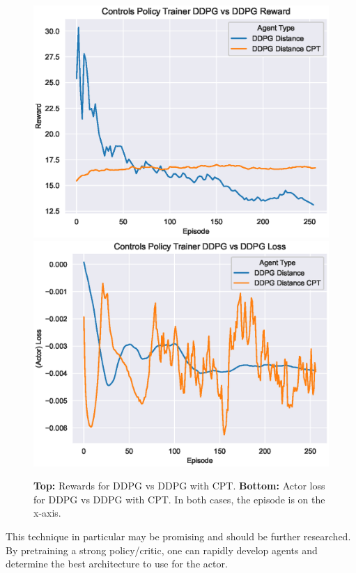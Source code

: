 \begin{figure}[!ht]
    \centering
    \includegraphics[scale=0.5]
    {./figures/cpt/rewards-by-agent-cpt}
    \includegraphics[scale=0.5]
    {./figures/cpt/loss-by-agent-cpt}
    \caption{
        \textbf{Top:} Rewards for DDPG vs DDPG with CPT.
        \textbf{Bottom:} Actor loss for DDPG vs DDPG with CPT.
        In both cases, the episode is on the x-axis.
    }
    \label{fig:cpt-graphs}
\end{figure}

This technique in particular may be promising and should be further researched.
By pretraining a strong policy/critic, one can rapidly develop agents and determine
the best architecture to use for the actor.
